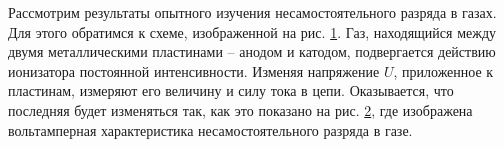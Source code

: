 \documentclass[a4paper,10pt]{book}
\begin{document}
Рассмотрим результаты опытного изучения несамостоятельного разряда в газах. Для этого обратимся к схеме, изображенной на рис. \ref{pic51}. Газ, находящийся между двумя металлическими пластинами -- анодом и катодом, подвергается действию ионизатора постоянной интенсивности. Изменяя напряжение $U$, приложенное к пластинам, измеряют его величину и силу тока в цепи. Оказывается, что последняя будет изменяться так, как это показано на рис. \ref{pic52}, где изображена вольтамперная характеристика несамостоятельного разряда в газе.

\begin{figure}[h]
	\caption{}
	\label{pic51}
\end{figure}
\begin{figure}[h]
	\caption{}
	\label{pic52}
\end{figure}
\end{document}
